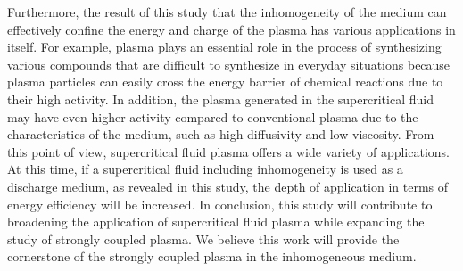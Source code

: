 Furthermore, the result of this study that the inhomogeneity of the medium can effectively confine the energy and charge of the plasma has various applications in itself. For example, plasma plays an essential role in the process of synthesizing various compounds that are difficult to synthesize in everyday situations because plasma particles can easily cross the energy barrier of chemical reactions due to their high activity. In addition, the plasma generated in the supercritical fluid may have even higher activity compared to conventional plasma due to the characteristics of the medium, such as high diffusivity and low viscosity. From this point of view, supercritical fluid plasma offers a wide variety of applications. At this time, if a supercritical fluid including inhomogeneity is used as a discharge medium, as revealed in this study, the depth of application in terms of energy efficiency will be increased. In conclusion, this study will contribute to broadening the application of supercritical fluid plasma while expanding the study of strongly coupled plasma. We believe this work will provide the cornerstone of the strongly coupled plasma in the inhomogeneous medium.

